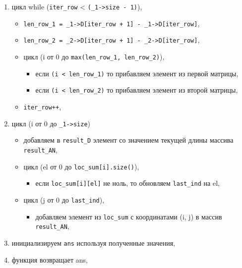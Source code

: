 \begin{enumerate}
	\item цикл while (\texttt{iter\_row} < \texttt{(\_1->size - 1)}),
	\begin{itemize}
		\item \texttt{len\_row\_1 = \_1->D[iter\_row + 1] - \_1->D[iter\_row]},
		\item 
		\texttt{len\_row\_2 = \_2->D[iter\_row + 1] - \_2->D[iter\_row]},
		\item цикл (i от 0 до \texttt{max(len\_row\_1, len\_row\_2)}),
		\begin{itemize}
			\item если \texttt{(i < len\_row\_1)} то прибавляем элемент из первой матрицы,
			\item если \texttt{(i < len\_row\_2)} то прибавляем элемент из второй матрицы,
		\end{itemize}
 		\item \texttt{iter\_row++},
	\end{itemize}
	
	\item цикл (i от 0 до \texttt{\_1->size})
	\begin{itemize}
		\item добавляем в \texttt{result\_D} элемент со значением текущей длины массива \texttt{result\_AN},
		\item цикл (el от 0 до \texttt{loc\_sum[i].size()}),
		\begin{itemize}
			\item если \texttt{loc\_sum[i][el]} не ноль, то обновляем \texttt{last\_ind} на el,
		\end{itemize}
		\item цикл (j от 0 до \texttt{last\_ind}),
		\begin{itemize}
			\item добавляем элемент из \texttt{loc\_sum} с координатами (i, j) в массив \texttt{result\_AN}, 
		\end{itemize}
	\end{itemize} 
	
	\item инициализируем \texttt{ans} используя полученные значения,
	
	\item функция возвращает ans,
\end{enumerate}

